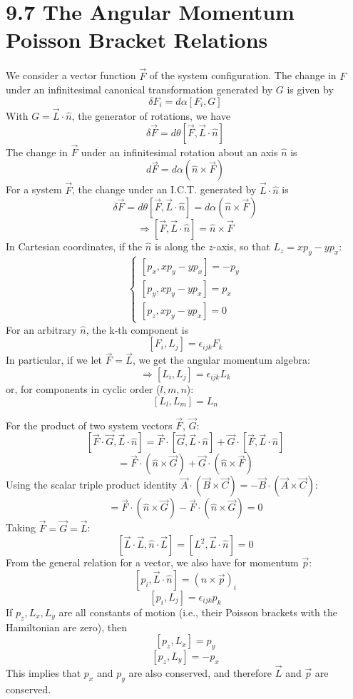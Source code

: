 \documentclass[12pt]{article}
\begin{document}
	\section*{9.7 The Angular Momentum Poisson Bracket Relations}
	
	We consider a vector function $\vec{F}$ of the system configuration. The change in $F$ under an infinitesimal canonical transformation generated by $G$ is given by
	$$
	\delta F_i = d\alpha [F_i, G]
	$$
	With $G = \vec{L} \cdot \hat{n}$, the generator of rotations, we have
	$$
	\delta \vec{F} = d\theta [\vec{F}, \vec{L} \cdot \hat{n}]
	$$
	The change in $\vec{F}$ under an infinitesimal rotation about an axis $\hat{n}$ is
	$$
	d\vec{F} = d\alpha (\hat{n} \times \vec{F})
	$$
	For a system $\vec{F}$, the change under an I.C.T. generated by $\vec{L} \cdot \hat{n}$ is
	$$
	\delta \vec{F} = d\theta [\vec{F}, \vec{L} \cdot \hat{n}] = d\alpha (\hat{n} \times \vec{F})
	$$
	$$
	\Rightarrow [\vec{F}, \vec{L} \cdot \hat{n}] = \hat{n} \times \vec{F}
	$$
	In Cartesian coordinates, if the $\hat{n}$ is along the $z$-axis, so that $L_z = x p_y - y p_x$:
	$$
	\begin{cases}
		[p_x, x p_y - y p_x] = -p_y \\
		[p_y, x p_y - y p_x] = p_x \\
		[p_z, x p_y - y p_x] = 0
	\end{cases}
	$$
	For an arbitrary $\hat{n}$, the k-th component is
	$$
	[F_i, L_j] = \epsilon_{ijk} F_k
	$$
	In particular, if we let $\vec{F} = \vec{L}$, we get the angular momentum algebra:
	$$
	\Rightarrow [L_i, L_j] = \epsilon_{ijk} L_k
	$$
	or, for components in cyclic order ($l, m, n$):
	$$
	[L_l, L_m] = L_n
	$$
	
	\vspace{1cm}
	
	For the product of two system vectors $\vec{F}$, $\vec{G}$:
	$$
	[\vec{F} \cdot \vec{G}, \vec{L} \cdot \hat{n}] = \vec{F} \cdot [\vec{G}, \vec{L} \cdot \hat{n}] + \vec{G} \cdot [\vec{F}, \vec{L} \cdot \hat{n}]
	$$
	$$
	= \vec{F} \cdot (\hat{n} \times \vec{G}) + \vec{G} \cdot (\hat{n} \times \vec{F})
	$$
	Using the scalar triple product identity $\vec{A} \cdot (\vec{B} \times \vec{C}) = -\vec{B} \cdot (\vec{A} \times \vec{C})$:
	$$
	= \vec{F} \cdot (\hat{n} \times \vec{G}) - \vec{F} \cdot (\hat{n} \times \vec{G}) = 0
	$$
	Taking $\vec{F} = \vec{G} = \vec{L}$:
	$$
	[\vec{L} \cdot \vec{L}, \hat{n} \cdot \vec{L}] = [L^2, \vec{L} \cdot \hat{n}] = 0
	$$
	From the general relation for a vector, we also have for momentum $\vec{p}$:
	$$
	[p_i, \vec{L} \cdot \hat{n}] = (\hat{n} \times \vec{p})_i
	$$
	$$
	[p_i, L_j] = \epsilon_{ijk} p_k
	$$
	If $p_z, L_x, L_y$ are all constants of motion (i.e., their Poisson brackets with the Hamiltonian are zero), then
	$$
	[p_z, L_x] = p_y
	$$
	$$
	[p_z, L_y] = -p_x
	$$
	This implies that $p_x$ and $p_y$ are also conserved, and therefore $\vec{L}$ and $\vec{p}$ are conserved.
	
\end{document}
